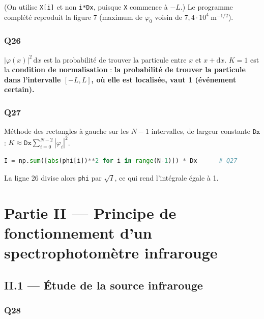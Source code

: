 \documentclass[11pt,a4paper]{article}
\begin{document}
(On utilise \texttt{X{[}i{]}} et non \texttt{i*Dx}, puisque \texttt{X} commence à \(-L\).) Le programme complété reproduit la figure 7 (maximum de \(\varphi_0\) voisin de \(7{,}4\cdot10^4\ \mathrm{m^{-1/2}}\)).

\hypertarget{q26}{%
\subsubsection{Q26}\label{q26}}

\(|\varphi(x)|^2\,\mathrm{d}x\) est la probabilité de trouver la particule entre \(x\) et \(x + \mathrm{d}x\). \(K = 1\) est la \textbf{condition de normalisation} : \textbf{la probabilité de trouver la particule dans l'intervalle \([-L, L]\), où elle est localisée, vaut 1 (événement certain).}

\hypertarget{q27}{%
\subsubsection{Q27}\label{q27}}

Méthode des rectangles à gauche sur les \(N-1\) intervalles, de largeur constante \(\mathtt{Dx}\) : \(K \approx \mathtt{Dx}\sum_{i=0}^{N-2}|\varphi_i|^2\).

\begin{lstlisting}[language=Python]
    I = np.sum([abs(phi[i])**2 for i in range(N-1)]) * Dx      # Q27
\end{lstlisting}

La ligne 26 divise alors \texttt{phi} par \(\sqrt{I}\), ce qui rend l'intégrale égale à 1.

\hypertarget{partie-ii-principe-de-fonctionnement-dun-spectrophotomuxe8tre-infrarouge}{%
\section{Partie II --- Principe de fonctionnement d'un spectrophotomètre infrarouge}\label{partie-ii-principe-de-fonctionnement-dun-spectrophotomuxe8tre-infrarouge}}

\hypertarget{ii.1-uxe9tude-de-la-source-infrarouge}{%
\subsection{II.1 --- Étude de la source infrarouge}\label{ii.1-uxe9tude-de-la-source-infrarouge}}

\hypertarget{q28}{%
\subsubsection{Q28}\label{q28}}
\end{document}
